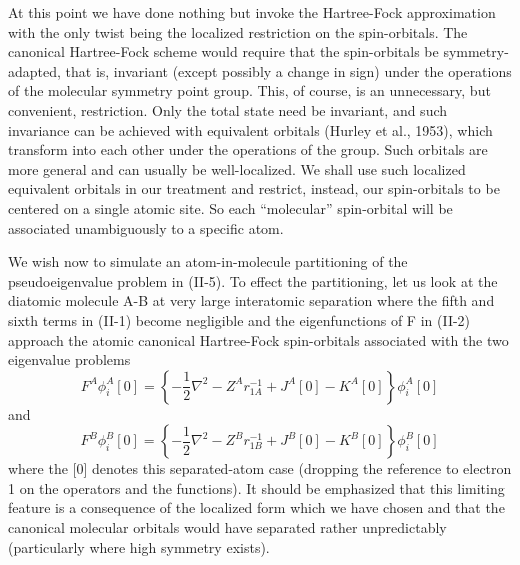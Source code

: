 \documentclass[12pt,letterpaper]{report}
\begin{document}
At this point we have done nothing but invoke the Hartree-Fock approximation with the only twist being the localized restriction on the spin-orbitals. The canonical Hartree-Fock scheme would require that the spin-orbitals be symmetry-adapted, that is, invariant (except possibly a change in sign) under the operations of the molecular symmetry point group. This, of course, is an unnecessary, but convenient, restriction. Only the total state need be invariant, and such invariance can be achieved with equivalent orbitals (Hurley et al., 1953), which transform into each other under the operations of the group. Such orbitals are more general and can usually be well-localized. We shall use such localized equivalent orbitals in our treatment and restrict, instead, our spin-orbitals to be centered on a single atomic site. So each ``molecular'' spin-orbital will be associated unambiguously to a specific atom.

We wish now to simulate an atom-in-molecule partitioning of the pseudoeigenvalue problem in (II-5). To effect the partitioning, let us look at the diatomic molecule A-B at very large interatomic separation where the fifth and sixth terms in (II-1) become negligible and the eigenfunctions of F in (II-2) approach the atomic canonical Hartree-Fock spin-orbitals associated with the two eigenvalue problems
\begin{equation}
F^A \phi_i^A[0] = \left\{-\frac{1}{2}\nabla^2 - Z^A r_{1A}^{-1} + J^A[0] - K^A[0]\right\} \phi_i^A[0]
\end{equation}
and
\begin{equation}
F^B \phi_i^B[0] = \left\{-\frac{1}{2}\nabla^2 - Z^B r_{1B}^{-1} + J^B[0] - K^B[0]\right\} \phi_i^B[0]
\end{equation}
where the [0] denotes this separated-atom case (dropping the reference to electron 1 on the operators and the functions). It should be emphasized that this limiting feature is a consequence of the localized form which we have chosen and that the canonical molecular orbitals would have separated rather unpredictably (particularly where high symmetry exists).
\end{document}
